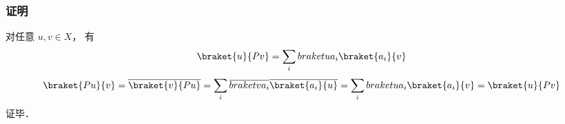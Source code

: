 \subsubsection{证明}
对任意 $u, v\in X$， 有
\begin{equation}
\braket{u}{Pv} = \sum_i \\braket{u}{a_i}\braket{a_i}{v}
\end{equation}
\begin{equation}
\braket{Pu}{v} = \overline {\braket{v}{Pu}} = \sum_i \overline{\\braket{v}{a_i}}\overline{\braket{a_i}{u}} = \sum_i \\braket{u}{a_i}\braket{a_i}{v} = \braket{u}{Pv}
\end{equation}
证毕．
